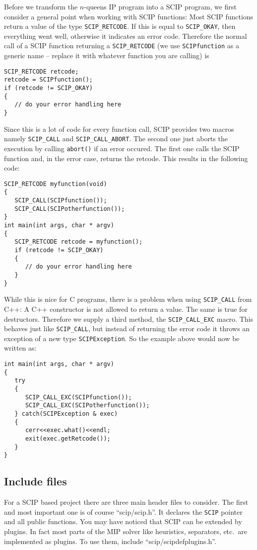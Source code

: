 \documentclass[a4paper]{article}
\begin{document}
Before we transform the $n$-queens IP program into a SCIP program, we first consider a general point when working with
SCIP functions: Most SCIP functions return a value of the type \verb+SCIP_RETCODE+. If this is equal to 
\verb+SCIP_OKAY+, then everything went well, otherwise it indicates an error code. Therefore the normal call of a 
SCIP function returning a \verb+SCIP_RETCODE+ (we use \verb+SCIPfunction+ as a generic name -- replace it with 
whatever function you are calling) is
\begin{verbatim}
SCIP_RETCODE retcode;
retcode = SCIPfunction();
if (retcode != SCIP_OKAY)
{
   // do your error handling here
}
\end{verbatim}
Since this is a lot of code for every function call, SCIP provides two macros namely \verb+SCIP_CALL+ and
\verb+SCIP_CALL_ABORT+. The second one just aborts the execution by calling \verb+abort()+ if an error occured. 
The first one calls the SCIP function and, in the error case, returns the retcode. This results in the following code:
\begin{verbatim}
SCIP_RETCODE myfunction(void)
{
   SCIP_CALL(SCIPfunction());
   SCIP_CALL(SCIPotherfunction());
}
int main(int args, char * argv)
{
   SCIP_RETCODE retcode = myfunction();
   if (retcode != SCIP_OKAY)
   {
      // do your error handling here
   }
}
\end{verbatim}
While this is nice for C programs, there is a problem when using \verb+SCIP_CALL+ from C++: A C++ constructor is not 
allowed to return a value. The same is true for destructors. Therefore we supply a third method, the 
\verb+SCIP_CALL_EXC+ macro. This behaves just like \verb+SCIP_CALL+, but instead of returning the error code it 
throws an exception of a new type \verb+SCIPException+. So the example above would now be written as:
\begin{verbatim}
int main(int args, char * argv)
{
   try
   {
      SCIP_CALL_EXC(SCIPfunction());
      SCIP_CALL_EXC(SCIPotherfunction());
   } catch(SCIPException & exec)
   {
      cerr<<exec.what()<<endl;
      exit(exec.getRetcode());
   }
}
\end{verbatim}

\subsection{Include files}

For a SCIP based project there are three main header files to consider. The first and most important one is of course
``scip/scip.h''. It declares the \verb+SCIP+ pointer and all public functions. You may have noticed that SCIP can be
extended by plugins. 
In fact most parts of the MIP solver like heuristics, separators, etc.\ are implemented as plugins. To use them, include 
``scip/scipdefplugins.h''.
\end{document}
